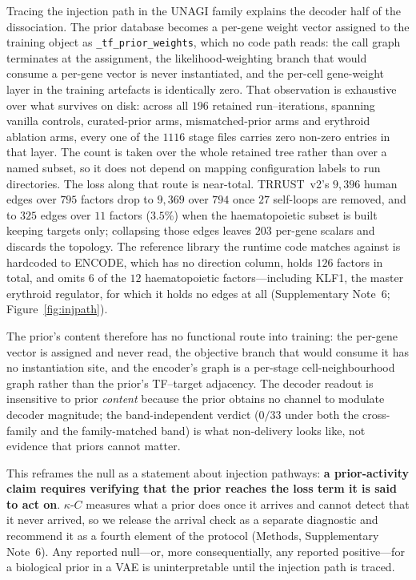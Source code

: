 \documentclass[11pt,a4paper]{article}
\begin{document}
Tracing the injection path in the UNAGI family explains the decoder half of the dissociation. The prior database becomes a per-gene weight vector assigned to the training object as \texttt{\_tf\_prior\_weights}, which no code path reads: the call graph terminates at the assignment, the likelihood-weighting branch that would consume a per-gene vector is never instantiated, and the per-cell gene-weight layer in the training artefacts is identically zero. That observation is exhaustive over what survives on disk: across all $196$ retained run--iterations, spanning vanilla controls, curated-prior arms, mismatched-prior arms and erythroid ablation arms, every one of the $1116$ stage files carries zero non-zero entries in that layer. The count is taken over the whole retained tree rather than over a named subset, so it does not depend on mapping configuration labels to run directories. The loss along that route is near-total. TRRUST~v2's $9{,}396$ human edges over $795$ factors drop to $9{,}369$ over $794$ once $27$ self-loops are removed, and to $325$ edges over $11$ factors ($3.5\%$) when the haematopoietic subset is built keeping targets only; collapsing those edges leaves $203$ per-gene scalars and discards the topology. The reference library the runtime code matches against is hardcoded to ENCODE, which has no direction column, holds $126$ factors in total, and omits $6$ of the $12$ haematopoietic factors---including KLF1, the master erythroid regulator, for which it holds no edges at all (Supplementary Note~6; Figure~\ref{fig:injpath}).

The prior's content therefore has no functional route into training: the per-gene vector is assigned and never read, the objective branch that would consume it has no instantiation site, and the encoder's graph is a per-stage cell-neighbourhood graph rather than the prior's TF--target adjacency. The decoder readout is insensitive to prior \emph{content} because the prior obtains no channel to modulate decoder magnitude; the band-independent verdict ($0/33$ under both the cross-family and the family-matched band) is what non-delivery looks like, not evidence that priors cannot matter.

This reframes the null as a statement about injection pathways: \textbf{a prior-activity claim requires verifying that the prior reaches the loss term it is said to act on}. $\kappa$-$C$ measures what a prior does once it arrives and cannot detect that it never arrived, so we release the arrival check as a separate diagnostic and recommend it as a fourth element of the protocol (Methods, Supplementary Note~6). Any reported null---or, more consequentially, any reported positive---for a biological prior in a VAE is uninterpretable until the injection path is traced.
\end{document}
